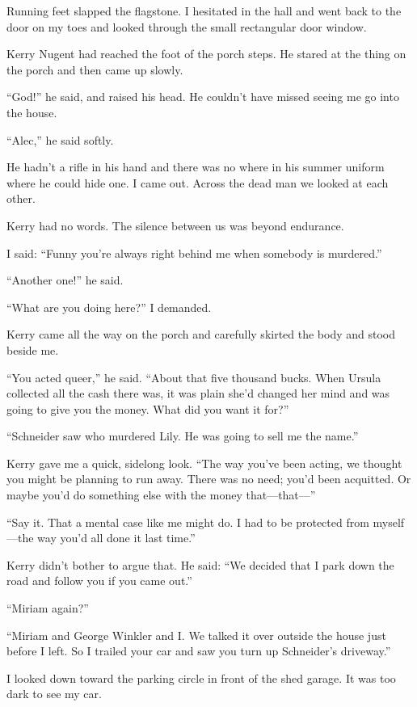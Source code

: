 \documentclass{novel}
\begin{document}
Running feet slapped the flagstone. I hesitated in the hall and went back to the door on my toes and looked through the small rectangular door window.

Kerry Nugent had reached the foot of the porch steps. He stared at the thing on the porch and then came up slowly. 

“God!” he said, and raised his head. He couldn’t have missed seeing me go into the house. 

“Alec,” he said softly.

He hadn’t a rifle in his hand and there was no where in his summer uniform where he could hide one. I came out. Across the dead man we looked at each other.

Kerry had no words. The silence between us was beyond endurance. 

I said: “Funny you’re always right behind me when somebody is murdered.”

“Another one!” he said.

“What are you doing here?” I demanded.

Kerry came all the way on the porch and carefully skirted the body and stood beside me. 

“You acted queer,” he said. “About that five thousand bucks. When Ursula collected all the cash there was, it was plain she’d changed her mind and was going to give you the money. What did you want it for?”

“Schneider saw who murdered Lily. He was going to sell me the name.” 

Kerry gave me a quick, sidelong look. “The way you’ve been acting, we thought you might be planning to run away. There was no need; you’d been acquitted. Or maybe you’d do something else with the money that—that—”

“Say it. That a mental case like me might do. I had to be protected from myself—the way you’d all done it last time.”

Kerry didn’t bother to argue that. He said: “We decided that I park down the road and follow you if you came out.”

“Miriam again?”

“Miriam and George Winkler and I. We talked it over outside the house just before I left. So I trailed your car and saw you turn up Schneider’s driveway.”

\scenestars

I looked down toward the parking circle in front of the shed garage. It was too dark to see my car. 
\end{document}
